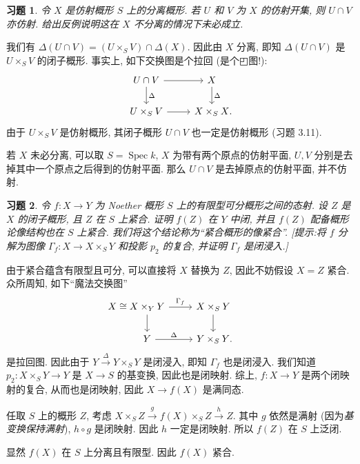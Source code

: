 \documentclass{article}
\theoremstyle{exercise}
\newtheorem{exercise}{习题}[section]
\theoremstyle{plain}
\theoremstyle{remark}
\newenvironment{proofc}{\proof}{\endproof}
\def\Spec{\operatorname{Spec}}
\begin{document}
\begin{exercise}
  令 $X$ 是仿射概形 $S$ 上的分离概形. 若 $U$ 和 $V$ 为 $X$ 的仿射开集, 则 $U \cap V$ 亦仿射.
  给出反例说明这在 $X$ 不分离的情况下未必成立.
\end{exercise}

\begin{proofc}
  我们有 $\Delta(U \cap V) = (U \times_S V) \cap \Delta(X)$.
  因此由 $X$ 分离, 即知 $\Delta(U \cap V)$ 是 $U \times_S V$ 的闭子概形.
  事实上, 如下交换图是个拉回 (是个{\segoe ◰}图!):
  \[\begin{tikzcd}
      U \cap V \ar[r] \ar[d, "\Delta"] & X \ar[d, "\Delta"]\\
      U \times_S V \ar[r] & X \times_S X\rlap{.}
    \end{tikzcd}\]
  由于 $U \times_S V$ 是仿射概形, 其闭子概形 $U \cap V$ 也一定是仿射概形 (习题 3.11).

  若 $X$ 未必分离, 可以取 $S = \Spec k$, $X$ 为带有两个原点的仿射平面,
  $U, V$ 分别是去掉其中一个原点之后得到的仿射平面.
  那么 $U \cap V$ 是去掉原点的仿射平面, 并不仿射.
\end{proofc}

\begin{exercise}
  令 $f \colon X \to Y$ 为 Noether 概形 $S$ 上的有限型可分概形之间的态射.
  设 $Z$ 是 $X$ 的闭子概形, 且 $Z$ 在 $S$ 上紧合.
  证明 $f(Z)$ 在 $Y$ 中闭,
  并且 $f(Z)$ 配备概形论像结构也在 $S$ 上紧合.
  我们将这个结论称为``紧合概形的像紧合''.
  [\emph{提示:将 $f$ 分解为图像 $\Gamma_f \colon X \to X \times_S Y$ 和投影 $p_2$ 的复合,
    并证明 $\Gamma_f$ 是闭浸入.}]
\end{exercise}

\begin{proofc}
  由于紧合蕴含有限型且可分, 可以直接将 $X$ 替换为 $Z$,
  因此不妨假设 $X = Z$ 紧合.
  众所周知, 如下``魔法交换图''
  \[\begin{tikzcd}
      \llap{$X \cong {}$} X \times_Y Y \ar[r, "\Gamma_f"] \ar[d] & X \times_S Y \ar[d] \\
      Y \ar[r, "\Delta"] & Y \times_S Y\rlap{.}
    \end{tikzcd}\]
  是拉回图. 因此由于 $Y \xrightarrow{\Delta} Y \times_S Y$ 是闭浸入, 即知 $\Gamma_f$ 也是闭浸入.
  我们知道 $p_2 \colon X \times_S Y \to Y$ 是 $X \to S$ 的基变换, 因此也是闭映射.
  综上, $f \colon X \to Y$ 是两个闭映射的复合, 从而也是闭映射, 因此 $X \to f(X)$ 是满同态.

  任取 $S$ 上的概形 $Z$, 考虑 $X \times_S Z \xrightarrow{g} f(X) \times_S Z \xrightarrow{h} Z$.
  其中 $g$ 依然是满射 (因为\emph{基变换保持满射}), $h \circ g$ 是闭映射.
  因此 $h$ 一定是闭映射. 所以 $f(Z)$ 在 $S$ 上泛闭.

  显然 $f(X)$ 在 $S$ 上分离且有限型. 因此 $f(X)$ 紧合.
\end{proofc}
\end{document}
